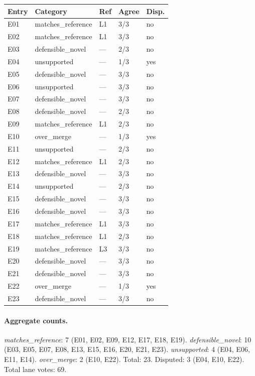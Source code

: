 \documentclass[11pt]{article}
\theoremstyle{gowthm}
\theoremstyle{gowplain}
\begin{document}
\begin{center}
\begin{tabular}{lllll}
\toprule
Entry & Category & Ref & Agree & Disp. \\
\midrule
E01 & matches\_reference & L1 & 3/3 & no \\
E02 & matches\_reference & L1 & 3/3 & no \\
E03 & defensible\_novel & --- & 2/3 & no \\
E04 & unsupported & --- & 1/3 & yes \\
E05 & defensible\_novel & --- & 3/3 & no \\
E06 & unsupported & --- & 3/3 & no \\
E07 & defensible\_novel & --- & 3/3 & no \\
E08 & defensible\_novel & --- & 2/3 & no \\
E09 & matches\_reference & L1 & 2/3 & no \\
E10 & over\_merge & --- & 1/3 & yes \\
E11 & unsupported & --- & 2/3 & no \\
E12 & matches\_reference & L1 & 2/3 & no \\
E13 & defensible\_novel & --- & 3/3 & no \\
E14 & unsupported & --- & 2/3 & no \\
E15 & defensible\_novel & --- & 3/3 & no \\
E16 & defensible\_novel & --- & 3/3 & no \\
E17 & matches\_reference & L1 & 3/3 & no \\
E18 & matches\_reference & L1 & 2/3 & no \\
E19 & matches\_reference & L3 & 3/3 & no \\
E20 & defensible\_novel & --- & 3/3 & no \\
E21 & defensible\_novel & --- & 3/3 & no \\
E22 & over\_merge & --- & 1/3 & yes \\
E23 & defensible\_novel & --- & 3/3 & no \\
\bottomrule
\end{tabular}
\end{center}

\paragraph{Aggregate counts.}
\emph{matches\_reference}: 7 (E01, E02, E09, E12, E17, E18, E19).
\emph{defensible\_novel}: 10 (E03, E05, E07, E08, E13, E15, E16, E20, E21, E23).
\emph{unsupported}: 4 (E04, E06, E11, E14).
\emph{over\_merge}: 2 (E10, E22).
Total: 23. Disputed: 3 (E04, E10, E22). Total lane votes: 69.
\end{document}
